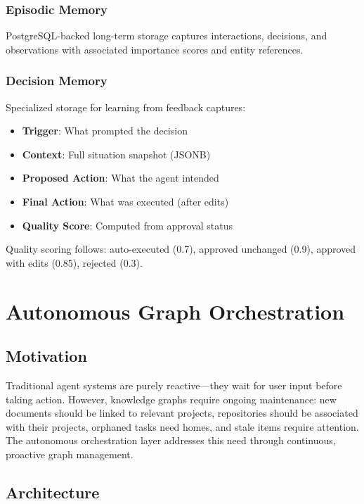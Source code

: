 \documentclass[11pt,a4paper]{article}
\begin{document}
\subsubsection{Episodic Memory}

PostgreSQL-backed long-term storage captures interactions, decisions, and observations with associated importance scores and entity references.

\subsubsection{Decision Memory}

Specialized storage for learning from feedback captures:
\begin{itemize}
    \item \textbf{Trigger}: What prompted the decision
    \item \textbf{Context}: Full situation snapshot (JSONB)
    \item \textbf{Proposed Action}: What the agent intended
    \item \textbf{Final Action}: What was executed (after edits)
    \item \textbf{Quality Score}: Computed from approval status
\end{itemize}

Quality scoring follows: auto-executed (0.7), approved unchanged (0.9), approved with edits (0.85), rejected (0.3).

\section{Autonomous Graph Orchestration}
\label{sec:autonomous}

\subsection{Motivation}

Traditional agent systems are purely reactive---they wait for user input before taking action. However, knowledge graphs require ongoing maintenance: new documents should be linked to relevant projects, repositories should be associated with their projects, orphaned tasks need homes, and stale items require attention. The autonomous orchestration layer addresses this need through continuous, proactive graph management.

\subsection{Architecture}
\end{document}
